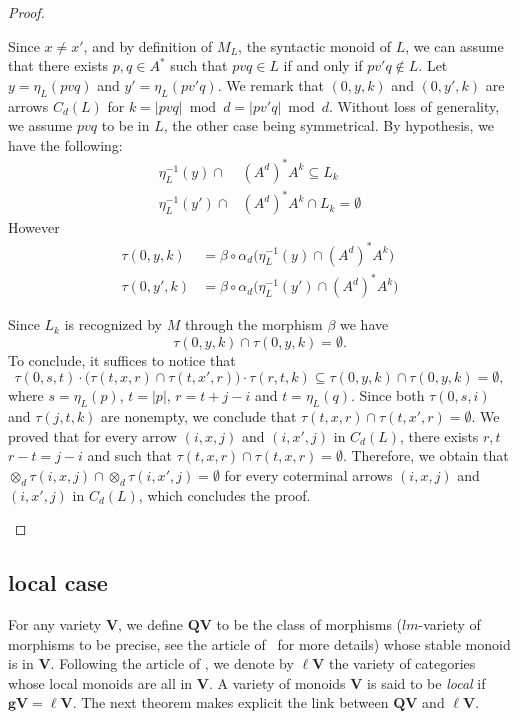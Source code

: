 \documentclass[submission,hidelink]{dmtcs-episciences}
\newcommand{\QV}{\mathbf{QV}}
\newcommand{\lV}{\mathbf{\ell V}}
\newcommand{\V}{\mathbf{V}}
\newcommand{\gV}{\mathbf{gV}}
\newenvironment{conditions}
{\begin{list}{\rm (\theenumi)}{\noindent \usecounter{enumi}\setlength{\topsep}{2pt}\setlength{\partopsep}{0pt}\setlength{\itemsep}{2pt}\setlength{\parsep}{0pt}\setlength{\leftmargin}{2.5em}\setlength{\labelwidth}{1.5em}\setlength{\labelsep}{0.5em}\setlength{\listparindent}{0pt}\setlength{\itemindent}{0pt}}}{\end{list}}
\begin{document}
\begin{proof}
\begin{conditions}
\begin{conditions}
						Since $x\neq x'$, and by definition of $M_L$, the syntactic monoid of $L$,
						we can assume that there exists $p,q\in A^*$ such that $pvq \in L$
						if and only if $pv'q\not\in L$.
						Let $y=\eta_L(pvq)$ and $y'=\eta_L(pv'q)$.
						We remark that $(0,y,k)$ and $(0,y',k)$ are
						arrows  $C_d(L)$ for $k=|pvq|\bmod{d}=|pv'q|\bmod{d}$.
						Without loss of generality, we assume $pvq$ to be in $L$, the other case being symmetrical.
						By hypothesis, we have the following:
						\begin{align*}
							\eta_L^{-1}(y)\cap& (A^d)^* A^k \subseteq L_k\\
							\eta_L^{-1}(y')\cap& (A^d)^* A^k \cap L_k = \emptyset
						\end{align*}
						However
						\begin{align*}
						\tau(0,y,k)&= \beta\circ\alpha_d\big(\eta_L^{-1}(y)\cap (A^d)^* A^k\big)\\
						\tau(0,y',k)&= \beta\circ\alpha_d\big(\eta_L^{-1}(y')\cap (A^d)^* A^k\big)
						\end{align*}

						Since $L_k$ is recognized by $M$ through the morphism $\beta$ we have
						$$\tau(0,y,k)\cap \tau(0,y,k)=\emptyset.$$
						To conclude, it suffices to notice that
						$$\tau(0,s,t)\cdot\Big(\tau(t,x,r)\cap \tau(t,x',r)\Big)\cdot\tau(r,t,k)\subseteq \tau(0,y,k)\cap \tau(0,y,k)= \emptyset,$$
						where $s=\eta_L(p)$, $t=|p|$, $r=t+j-i$ and $t=\eta_L(q)$. Since both $\tau(0,s,i)$ and
						$\tau(j,t,k)$ are nonempty, we conclude that $\tau(t,x,r)\cap \tau(t,x',r) = \emptyset$.
						We proved that for every arrow $(i,x,j)$ and $(i,x',j)$ in $C_d(L)$, there exists
						$r,t$ $r-t=j-i$ and such that $\tau(t,x,r)\cap \tau(t,x,r)=\emptyset$.
						Therefore, we obtain that  $\otimes_d\tau(i,x,j)\cap  \otimes_d\tau(i,x',j) =\emptyset$
						for every coterminal arrows $(i,x,j)$ and $(i,x',j)$ in $C_d(L)$, which concludes the proof.

					\end{conditions}



			\end{conditions}
		\end{proof}


\subsection{local case}\label{Subsection:Local}

	For any variety $\V$, we define $\QV$ to be the class of morphisms ($lm$-variety of morphisms to be precise,
	see the article of~\cite{PS05} for more details) whose stable
	monoid is in $\V$.
	Following the article of \cite{Tilson}, we denote by
	$\ell \V$ the variety of categories whose local monoids are all in $\V$.
	A variety of monoids $\V$ is said to be \emph{local} if $\gV = \lV$.
	The next theorem makes explicit the link between $\QV$ and $\ell\V$.
\end{document}
